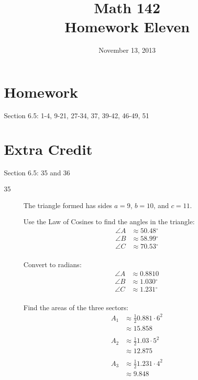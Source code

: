 \documentclass{exam}
\author{}
\date{November 13, 2013}
\title{Math 142 \\ Homework Eleven}
\newcommand{\dg}{\ensuremath{^\circ}}
\begin{document}
  \maketitle

  \section{Homework}
  Section 6.5: 1-4, 9-21, 27-34, 37, 39-42, 46-49, 51

  \section{Extra Credit}
  Section 6.5: 35 and 36

  \ifprintanswers

    \begin{description}
      \item[35]
        The triangle formed has sides $a = 9$, $b = 10$, and $c = 11$.

        Use the Law of Cosines to find the angles in the triangle:
        \begin{align*}
          \angle A & \approx 50.48 \dg \\
          \angle B & \approx 58.99 \dg \\
          \angle C & \approx 70.53 \dg \\
        \end{align*}

        Convert to radians:
        \begin{align*}
          \angle A & \approx 0.8810 \\
          \angle B & \approx 1.030 \dg \\
          \angle C & \approx 1.231 \dg \\
        \end{align*}

        Find the areas of the three sectors:
        \begin{align*}
          A_1 & \approx \frac{1}{2} 0.881 \cdot 6^2 \\
              & \approx 15.858 \\
          \\
          A_2 & \approx \frac{1}{2} 1.03 \cdot 5^2 \\
              & \approx 12.875 \\
          \\
          A_3 & \approx \frac{1}{2} 1.231 \cdot 4^2 \\
              & \approx 9.848 \\
        \end{align*}


\end{description}
\end{document}

